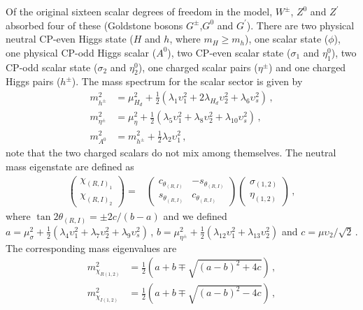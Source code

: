 \documentclass[12pt]{article}
\begin{document}
Of the original sixteen scalar degrees of freedom in the model, $W^{\pm}$, $Z^{0}$ and $Z^{\prime}$ absorbed four of these (Goldstone bosons $G^{\pm}$,$G^{0}$ and $G^{\prime}$). There are two physical neutral CP-even Higgs state ($H$ and $h$, where $m_{H} \geq m_{h}$), one scalar state ($\phi$), one physical CP-odd Higgs scalar ($A^{0}$), two CP-even scalar state ($\sigma_{1}$ and $\eta^{0}_{1}$), two CP-odd scalar state ($\sigma_{2}$ and $\eta^{0}_{2}$), one charged scalar pairs ($\eta^{\pm}$) and one charged Higgs pairs ($h^{\pm}$). The mass spectrum for the scalar sector is given by
\begin{align*}
    m_{h^{\pm}}^{2} &= \mu^{2}_{H_{d}} + \frac{1}{2}(\lambda_{1} \upsilon^{2}_{1} + 2\lambda_{H_{d}} \upsilon^{2}_{2} + \lambda_{6} \upsilon^{2}_{s})\,, \\
    m_{\eta^{\pm}}^{2} &= \mu_{\eta}^{2} + \frac{1}{2} (\lambda_{5} \upsilon^{2}_{1} + \lambda_{8} \upsilon^{2}_{2} + \lambda_{10} \upsilon^{2}_{s} )\,, \\
    m_{A^{0}}^{2} &= m_{h^{\pm}}^{2} + \frac{1}{2} \lambda_{2} \upsilon^{2}_{1} \,,
\end{align*}
%
note that the two charged scalars do not mix among themselves. The neutral mass eigenstate are defined as
%
\begin{align*}
    \begin{pmatrix}\chi_{(R,I)_{1}} \\ \chi_{(R,I)_{2}} \end{pmatrix} =& \begin{pmatrix} c_{\theta_{(R,I)}} & -s_{\theta_{(R,I)}} \\ s_{\theta_{(R,I)}} & c_{\theta_{(R,I)}} \end{pmatrix} \begin{pmatrix}\sigma_{(1,2)} \\ \eta_{(1,2)} \end{pmatrix} \,,
\end{align*}
%
where $\tan2\theta_{(R,I)} = \pm2c/(b-a)$ and we defined $a = \mu^{2}_{\sigma}+\frac{1}{2}(\lambda_{4} \upsilon^{2}_{1} + \lambda_{7} \upsilon^{2}_{2} + \lambda_{9} \upsilon^{2}_{s})$\,,
$b = \mu^{2}_{\eta^{\pm}} + \frac{1}{2}(\lambda_{12} \upsilon^{2}_{1} + \lambda_{13} \upsilon^{2}_{2})$ and $c = \mu \upsilon_{2}/\sqrt{2}$\,. The corresponding mass eigenvalues are
\begin{align*}
    m_{\chi_{R(1,2)}}^{2} &= \frac{1}{2} \left(a + b \mp \sqrt{(a-b)^{2} + 4c} \right)\,, \\
     m_{\chi_{I(1,2)}}^{2} &= \frac{1}{2} \left(a + b \mp \sqrt{(a-b)^{2} - 4c} \right)\,,
\end{align*}
\end{document}
